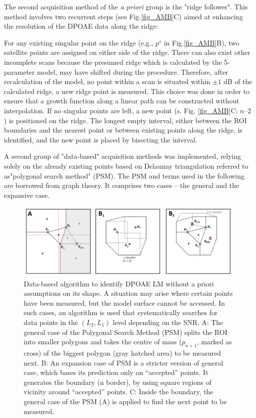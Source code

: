 \documentclass[journal,twoside,web]{ieeecolor2}
\begin{document}
The second acquisition method of the \textit{a priori} group is the "ridge follower".
This method involves two recurrent steps (see Fig.\ref{fig_AMB}C) aimed at enhancing the resolution of the DPOAE data along the ridge:
\begin{algorithmic}[1]
\STATE For any existing singular point on the ridge (e.g., $p^s$ in Fig.\ref{fig_AMB}B), two satellite points are assigned on either side of the ridge.
There can also exist other incomplete scans because the presumed ridge which is calculated by the 5-parameter model, may have shifted during the procedure.
Therefore, after recalculation of the model, no point within a scan is situated within $\pm1$ dB of the calculated ridge, a new ridge point is measured.
This choice was done in order to ensure that a growth function along a linear path can be constructed without interpolation.
\STATE If no singular points are left, a new point (s.
Fig. \ref{fig_AMB}C: $n – 2$) is positioned on the ridge.
The longest empty interval, either between the ROI boundaries and the nearest point or between existing points along the ridge, is identified, and the new point is placed by bisecting the interval.
\end{algorithmic} 

A second group of "data-based" acquisition methods was implemented, relying solely on the already existing points based on Delaunay triangulation \cite{LS1980} referred to as"polygonal search method" (PSM).
The PSM and terms used in the following are borrowed from graph theory.
It comprises two cases – the general and the expansive case.

\begin{figure}
\includegraphics[width=\textwidth]{Fig_ALM_DataBased} %
\caption{Data-based algorithm to identify DPOAE LM without a priori assumptions on its shape.
A situation may arise where certain points have been measured, but the model surface cannot be accessed.
In such cases, an algorithm is used that systematically searches for data points in the $(L_2, L_1)$ level depending on the SNR.
A: The general case of the Polygonal Search Method (PSM) splits the ROI into smaller polygons and takes the centre of mass ($p_{n+1}$, marked as cross) of the biggest polygon (gray hatched area) to be measured next.
B: An expansion case of PSM is a stricter version of general case, which bases its prediction only on “accepted” points.
It generates the boundary (n border), by using square regions of vicinity around “accepted” points.
C: Inside the boundary, the general case of the PSM (A) is applied to find the next point to be measured.}
\label{fig_ADB}
\end{figure}
\end{document}
